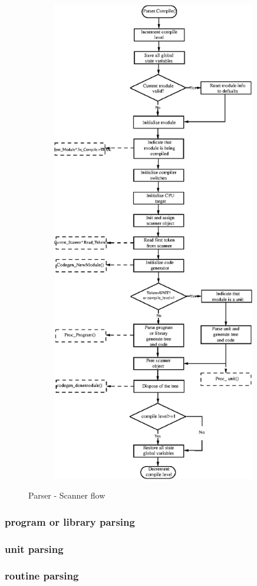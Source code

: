\documentclass [12pt]{article}
\begin{document}
\begin{figure}
\includegraphics[width=4.99in,height=8.36in]{arch8.eps}
\fi
\label{fig8}
\caption{Parser - Scanner flow}
\end{figure}

\subsubsection{program or library parsing }

\subsubsection{unit parsing }
\label{subsubsec:mylabel12}

\subsubsection{routine parsing }
\label{subsubsec:routine}
\end{document}
